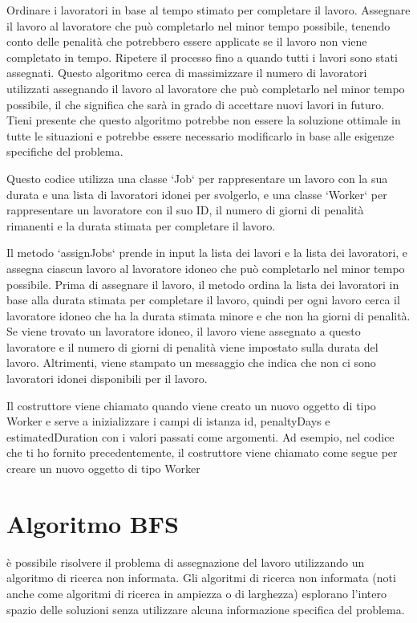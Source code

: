 Ordinare i lavoratori in base al tempo stimato per completare il lavoro.
Assegnare il lavoro al lavoratore che può completarlo nel minor tempo possibile, tenendo conto delle penalità che potrebbero essere applicate se il lavoro non viene completato in tempo.
Ripetere il processo fino a quando tutti i lavori sono stati assegnati.
Questo algoritmo cerca di massimizzare il numero di lavoratori utilizzati assegnando il lavoro al lavoratore che può completarlo nel minor tempo possibile, il che significa che sarà in grado di accettare nuovi lavori in futuro. Tieni presente che questo algoritmo potrebbe non essere la soluzione ottimale in tutte le situazioni e potrebbe essere necessario modificarlo in base alle esigenze specifiche del problema.



Questo codice utilizza una classe `Job` per rappresentare un lavoro con la sua durata e una lista di lavoratori idonei per svolgerlo, e una classe `Worker` per rappresentare un lavoratore con il suo ID, il numero di giorni di penalità rimanenti e la durata stimata per completare il lavoro.

Il metodo `assignJobs` prende in input la lista dei lavori e la lista dei lavoratori, e assegna ciascun lavoro al lavoratore idoneo che può completarlo nel minor tempo possibile. Prima di assegnare il lavoro, il metodo ordina la lista dei lavoratori in base alla durata stimata per completare il lavoro, quindi per ogni lavoro cerca il lavoratore idoneo che ha la durata stimata minore e che non ha giorni di penalità. Se viene trovato un lavoratore idoneo, il lavoro viene assegnato a questo lavoratore e il numero di giorni di penalità viene impostato sulla durata del lavoro. Altrimenti, viene stampato un messaggio che indica che non ci sono lavoratori idonei disponibili per il lavoro.

Il costruttore viene chiamato quando viene creato un nuovo oggetto di tipo Worker e serve a inizializzare i campi di istanza id, penaltyDays e estimatedDuration con i valori passati come argomenti. Ad esempio, nel codice che ti ho fornito precedentemente, il costruttore viene chiamato come segue per creare un nuovo oggetto di tipo Worker


\section {Algoritmo BFS}
è possibile risolvere il problema di assegnazione del lavoro utilizzando un algoritmo di ricerca non informata. Gli algoritmi di ricerca non informata (noti anche come algoritmi di ricerca in ampiezza o di larghezza) esplorano l'intero spazio delle soluzioni senza utilizzare alcuna informazione specifica del problema.

